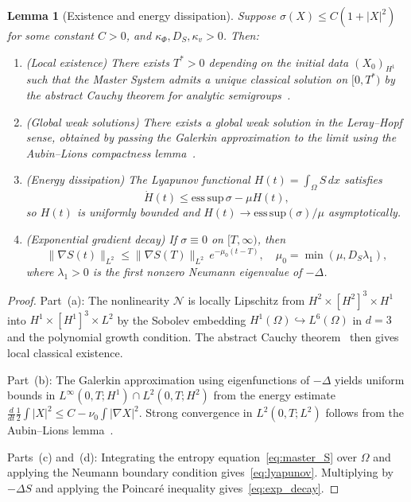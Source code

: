 \documentclass[12pt,a4paper]{article}
\theoremstyle{plain}
\newtheorem{lemma}[theorem]{Lemma}
\theoremstyle{definition}
\theoremstyle{remark}
\begin{document}
\begin{lemma}[Existence and energy dissipation]
\label{lem:existence}
Suppose $\sigma(X) \leq C(1 + |X|^2)$ for some constant $C > 0$, and
$\kappa_\Phi, D_S, \kappa_v > 0$. Then:
\begin{enumerate}[label=\textup{(\alph*)}]
  \item \textup{(Local existence)} There exists $T^* > 0$ depending on the initial
    data $(X_0)_{H^1}$ such that the Master System admits a unique classical solution
    on $[0,T^*)$ by the abstract Cauchy theorem for analytic
    semigroups~\cite{Pazy1983}.
  \item \textup{(Global weak solutions)} There exists a global weak solution in the
    Leray--Hopf sense, obtained by passing the Galerkin approximation to the limit
    using the Aubin--Lions compactness lemma~\cite{Lions1969}.
  \item \textup{(Energy dissipation)} The Lyapunov functional
    $H(t) = \int_\Omega S\,dx$ satisfies
    \begin{equation}
      \dot{H}(t) \leq \mathrm{ess\,sup}\,\sigma - \mu H(t),
      \label{eq:lyapunov}
    \end{equation}
    so $H(t)$ is uniformly bounded and $H(t)\to \mathrm{ess\,sup}(\sigma)/\mu$
    asymptotically.
  \item \textup{(Exponential gradient decay)} If $\sigma\equiv 0$ on $[T,\infty)$, then
    \begin{equation}
      \|\nabla S(t)\|_{L^2} \leq \|\nabla S(T)\|_{L^2}\,e^{-\mu_0(t-T)},
      \quad \mu_0 = \min(\mu, D_S\lambda_1),
      \label{eq:exp_decay}
    \end{equation}
    where $\lambda_1 > 0$ is the first nonzero Neumann eigenvalue of $-\Delta$.
\end{enumerate}
\end{lemma}

\begin{proof}
Part~(a): The nonlinearity $\mathcal{N}$ is locally Lipschitz from $H^2\times[H^2]^3\times H^1$
into $H^1\times[H^1]^3\times L^2$ by the Sobolev embedding $H^1(\Omega)\hookrightarrow L^6(\Omega)$
in $d=3$ and the polynomial growth condition. The abstract Cauchy theorem~\cite{Pazy1983}
then gives local classical existence.

Part~(b): The Galerkin approximation using eigenfunctions of $-\Delta$ yields
uniform bounds in $L^\infty(0,T;H^1)\cap L^2(0,T;H^2)$ from the energy estimate
$\frac{d}{dt}\frac{1}{2}\int|X|^2 \leq C - \nu_0\int|\nabla X|^2$. Strong convergence
in $L^2(0,T;L^2)$ follows from the Aubin--Lions lemma~\cite{Lions1969}.

Parts~(c) and~(d): Integrating the entropy equation~\eqref{eq:master_S} over $\Omega$
and applying the Neumann boundary condition gives~\eqref{eq:lyapunov}. Multiplying
by $-\Delta S$ and applying the Poincar\'{e} inequality gives~\eqref{eq:exp_decay}.
\end{proof}
\end{document}
